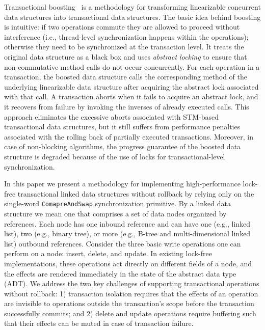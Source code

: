 \documentclass[10pt,conference,compsocconf]{IEEEtran}
\begin{document}
Transactional boosting~\cite{herlihy2008transactional} is a methodology for transforming linearizable concurrent data structures into transactional data structures.
The basic idea behind boosting is intuitive: if two operations commute they are allowed to proceed without interference (i.e., thread-level synchronization happens within the operations); otherwise they need to be synchronized at the transaction level.
It treats the original data structure as a black box and uses \emph{abstract locking} to ensure that non-commutative method calls do not occur concurrently. 
For each operation in a transaction, the boosted data structure calls the corresponding method of the underlying linearizable data structure after acquiring the abstract lock associated with that call. 
A transaction aborts when it fails to acquire an abstract lock, and it recovers from failure by invoking the inverses of already executed calls. 
This approach eliminates the excessive aborts associated with STM-based transactional data structures, but it still suffers from performance penalties associated with the rolling back of partially executed transactions.
Moreover, in case of non-blocking algorithms, the progress guarantee of the boosted data structure is degraded because of the use of locks for transactional-level synchronization.
 
In this paper we present a methodology for implementing high-performance lock-free transactional linked data structures without rollback by relying only on the single-word \texttt{ComapreAndSwap} synchronization primitive.
By a linked data structure we mean one that comprises a set of data nodes organized by references. 
Each node has one inbound reference and can have one (e.g., linked list), two (e.g., binary tree), or more (e.g., B-tree and multi-dimensional linked list) outbound references.
Consider the three basic write operations one can perform on a node: insert, delete, and update.
In existing lock-free implementations, these operations act directly on different fields of a node, and the effects are rendered immediately in the state of the abstract data type (ADT).
We address the two key challenges of supporting transactional operations without rollback: 1) transaction isolation requires that the effects of an operation are invisible to operations outside the transaction's scope before the transaction successfully commits; and 2) delete and update operations require buffering such that their effects can be muted in case of transaction failure.
\end{document}
